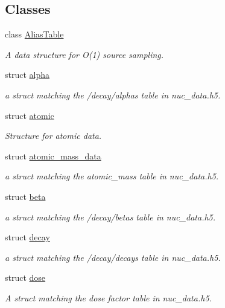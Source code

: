 \subsection*{Classes}
\begin{DoxyCompactItemize}
\item 
class \hyperlink{classpyne_1_1_alias_table}{Alias\+Table}
\begin{DoxyCompactList}\small\item\em A data structure for O(1) source sampling. \end{DoxyCompactList}\item 
struct \hyperlink{structpyne_1_1alpha}{alpha}
\begin{DoxyCompactList}\small\item\em a struct matching the \textquotesingle{}/decay/alphas\textquotesingle{} table in nuc\+\_\+data.\+h5. \end{DoxyCompactList}\item 
struct \hyperlink{structpyne_1_1atomic}{atomic}
\begin{DoxyCompactList}\small\item\em Structure for atomic data. \end{DoxyCompactList}\item 
struct \hyperlink{structpyne_1_1atomic__mass__data}{atomic\+\_\+mass\+\_\+data}
\begin{DoxyCompactList}\small\item\em a struct matching the atomic\+\_\+mass table in nuc\+\_\+data.\+h5. \end{DoxyCompactList}\item 
struct \hyperlink{structpyne_1_1beta}{beta}
\begin{DoxyCompactList}\small\item\em a struct matching the \textquotesingle{}/decay/betas\textquotesingle{} table in nuc\+\_\+data.\+h5. \end{DoxyCompactList}\item 
struct \hyperlink{structpyne_1_1decay}{decay}
\begin{DoxyCompactList}\small\item\em a struct matching the \textquotesingle{}/decay/decays\textquotesingle{} table in nuc\+\_\+data.\+h5. \end{DoxyCompactList}\item 
struct \hyperlink{structpyne_1_1dose}{dose}
\begin{DoxyCompactList}\small\item\em A struct matching the dose factor table in nuc\+\_\+data.\+h5. \end{DoxyCompactList}\item 

\end{DoxyCompactItemize}
